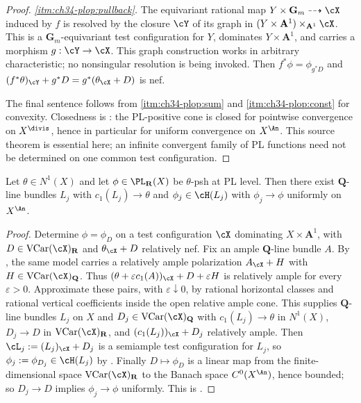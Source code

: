 \begin{proof}
\emph{\cref{itm:ch34-plop:pullback}.}  The equivariant rational map
$Y\times\mathbf G_m\dashrightarrow\cX$ induced by $f$ is resolved by
the closure $\cY$ of its graph in
$(Y\times\mathbf A^1)\times_{\mathbf A^1}\cX$.  This is a
$\mathbf G_m$-equivariant test configuration for $Y$, dominates
$Y\times\mathbf A^1$, and carries a morphism $g:\cY\to\cX$.  This graph
construction works in arbitrary characteristic; no nonsingular resolution
is being invoked.  Then $f^*\phi=\phi_{g^*D}$ and
$(f^*\theta)_{\cY}+g^*D=g^*(\theta_{\cX}+D)$ is nef.

The final sentence follows from \cref{itm:ch34-plop:sum} and
\cref{itm:ch34-plop:const} for convexity.  Closedness is
\cite[Corollary~3.22]{BJ22}: the PL-positive cone is closed for pointwise
convergence on $X^{\divis}$, hence in particular for uniform convergence
on $X^{\An}$.  This source theorem is essential here; an infinite
convergent family of PL functions need not be determined on one common test
configuration.
\end{proof}

\begin{lemma}
\label{lem:ch34-pl-fs-approximation}
Let $\theta\in N^1(X)$ and let $\phi\in\PL_{\mathbf R}(X)$ be
$\theta$-psh at PL level.  Then there exist $\mathbf Q$-line bundles
$L_j$ with $c_1(L_j)\to\theta$ and $\phi_j\in\cH(L_j)$ with
$\phi_j\to\phi$ uniformly on $X^{\An}$.
\end{lemma}

\begin{proof}
Determine $\phi=\phi_D$ on a test configuration $\cX$ dominating
$X\times\mathbf A^1$, with $D\in\operatorname{VCar}(\cX)_{\mathbf R}$ and
$\theta_{\cX}+D$ relatively nef.
Fix an ample $\mathbf Q$-line bundle $A$.  By
\cite[Lemma~2.33]{BJ22}, the same model carries a relatively ample
polarization $A_{\cX}+H$ with
$H\in\operatorname{VCar}(\cX)_{\mathbf Q}$.
Thus $(\theta+\varepsilon c_1(A))_{\cX}+D+\varepsilon H$ is
relatively ample for every $\varepsilon>0$.
Approximate these pairs, with $\varepsilon\downarrow0$, by rational
horizontal classes and rational vertical coefficients inside the open
relative ample cone.  This supplies $\mathbf Q$-line bundles $L_j$ on
$X$ and $D_j\in\operatorname{VCar}(\cX)_{\mathbf Q}$ with
$c_1(L_j)\to\theta$ in $N^1(X)$, $D_j\to D$ in
$\operatorname{VCar}(\cX)_{\mathbf R}$, and
$(c_1(L_j))_{\cX}+D_j$ relatively ample.  Then
$\cL_j:=(L_j)_{\cX}+D_j$ is a semiample test configuration for $L_j$,
so $\phi_j:=\phi_{D_j}\in\cH(L_j)$ by .
Finally $D\mapsto\phi_D$ is a linear map from the finite-dimensional
space $\operatorname{VCar}(\cX)_{\mathbf R}$ to the Banach space
$C^0(X^{\An})$, hence bounded; so $D_j\to D$ implies
$\phi_j\to\phi$ uniformly.  This is \cite[Lemma~3.7]{BJ22}.
\end{proof}

